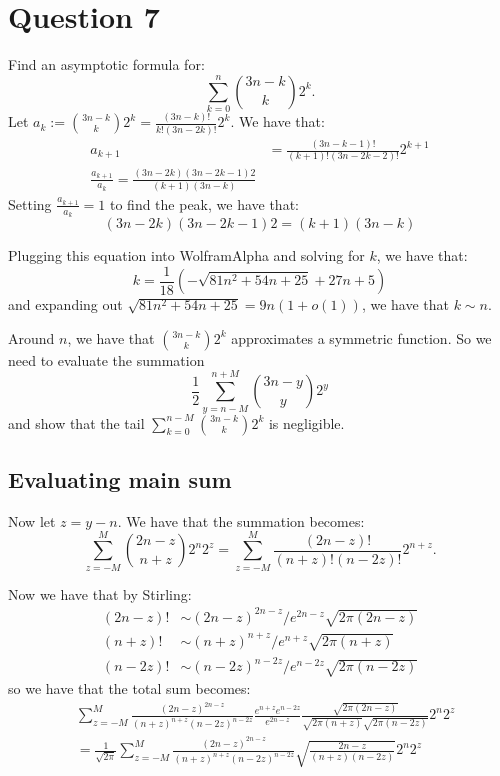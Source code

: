 \documentclass[]{article}
\theoremstyle{definition}
\numberwithin{theorem}{section}
\numberwithin{equation}{section}
\begin{document}
\section{Question 7}
Find an asymptotic formula for:
\begin{equation}
	\sum_{k = 0}^n \binom{3n - k}{k} 2^k.
\end{equation}
Let $a_k := \binom{3n - k}{k} 2^k = \frac{(3n - k)!}{k! (3n - 2k)!} 2^k$.
We have that:
\begin{align*}
	a_{k + 1} &= \frac{(3n - k - 1)!}{(k + 1)! (3n - 2k - 2)!} 2^{k + 1}\\
	\frac{a_{k + 1}}{a_k} = \frac{(3n - 2k)(3n - 2k - 1) 2}{(k + 1)(3n - k)}
\end{align*}
Setting $\frac{a_{k + 1}}{a_k} = 1$ to find the peak, we have that:
\begin{equation}
	(3n - 2k)(3n - 2k - 1) 2 = (k + 1)(3n - k)
\end{equation}

Plugging this equation into WolframAlpha and solving for $k$, we have that:
\begin{equation}
	k = \frac{1}{18}\left(- \sqrt{81 n^2 + 54 n + 25} + 27 n + 5\right)
\end{equation}
and expanding out $\sqrt{81 n^2 + 54 n + 25} = 9 n(1 + o(1))$, we have that
$k \sim n$. 

Around $n$, we have that $\binom{3n - k}{k} 2^k$ approximates a symmetric function. So we need to evaluate the summation
\begin{equation}
	\frac{1}{2}\sum_{y = n - M}^{n + M} \binom{3n - y}{y} 2^y
\end{equation}
and show that the tail $\sum_{k = 0}^{n - M} \binom{3n - k}{k} 2^k$ is negligible.

\subsection{Evaluating main sum}
Now let $z = y - n$. We have that the summation becomes:
\begin{equation}
	\sum_{z = -M}^M \binom{2n - z}{n + z} 2^n 2^z = \sum_{z = -M}^M\frac{(2n - z)!}{(n + z)! (n - 2z)!} 2^{n + z}. 
\end{equation}

Now we have that by Stirling:
\begin{align*}
	(2n - z)! &\sim (2n - z)^{2n-z}/e^{2n - z} \sqrt{2 \pi (2n-z)}\\
	(n + z)! &\sim (n + z)^{n + z}/e^{n + z} \sqrt{2 \pi (n + z)}\\
	(n - 2z)! &\sim (n - 2z)^{n - 2z}/e^{n - 2z} \sqrt{2 \pi (n -2z)}
\end{align*}
so we have that the total sum becomes:
\begin{align*}
	&\sum_{z = -M}^M \frac{(2n - z)^{2n - z}}{(n + z)^{n + z} (n - 2z)^{n - 2z}} \frac{e^{n + z} e^{n - 2z}}{e^{2n - z}} \frac{\sqrt{2\pi (2n - z)}}{\sqrt{2\pi (n + z)} \sqrt{2\pi (n - 2z)}} 2^{n} 2^z \\
	&= \frac{1}{\sqrt{2\pi}}\sum_{z = -M}^M \frac{(2n - z)^{2n - z}}{(n + z)^{n + z} (n - 2z)^{n - 2z}} \sqrt{\frac{2n - z}{(n + z)(n - 2z)}} 2^{n} 2^z
\end{align*}
\end{document}
